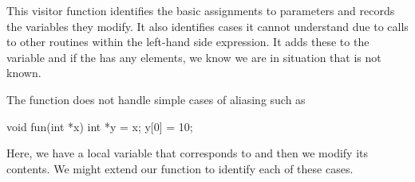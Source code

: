 This visitor function identifies the basic assignments to parameters
and records the variables they modify.  It also identifies cases it
cannot understand due to calls to other routines within the left-hand
side expression.  It adds these to the  variable and if
the has any elements, we know we are in situation that is not known.

The function does not handle simple cases of aliasing such as
\begin{CCode}
void fun(int *x)
{
  int *y = x;
  y[0] = 10;
}
\end{CCode}
Here, we have a local variable that corresponds to  and then
we modify its contents.  We might extend our function to identify each
of these cases.



